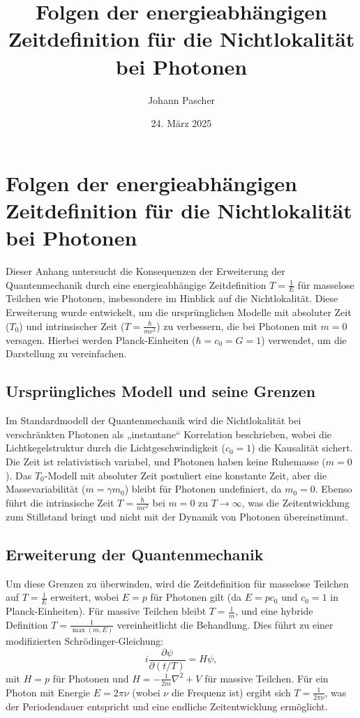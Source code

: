 \documentclass[a4paper,12pt]{article}
\begin{document}
	
	\title{Folgen der energieabhängigen Zeitdefinition für die Nichtlokalität bei Photonen}
	\author{Johann Pascher}
	\date{24. März 2025}
	\maketitle
	
	\tableofcontents %
	\newpage %
	
	\section{Folgen der energieabhängigen Zeitdefinition für die Nichtlokalität bei Photonen}
	Dieser Anhang untersucht die Konsequenzen der Erweiterung der Quantenmechanik durch eine energieabhängige Zeitdefinition \( T = \frac{1}{E} \) für masselose Teilchen wie Photonen, insbesondere im Hinblick auf die Nichtlokalität. Diese Erweiterung wurde entwickelt, um die ursprünglichen Modelle mit absoluter Zeit (\( T_0 \)) und intrinsischer Zeit (\( T = \frac{\hbar}{m c^2} \)) zu verbessern, die bei Photonen mit \( m = 0 \) versagen. Hierbei werden Planck-Einheiten (\( \hbar = c_0 = G = 1 \)) verwendet, um die Darstellung zu vereinfachen.
	
	\subsection{Ursprüngliches Modell und seine Grenzen}
	Im Standardmodell der Quantenmechanik wird die Nichtlokalität bei verschränkten Photonen als „instantane“ Korrelation beschrieben, wobei die Lichtkegelstruktur durch die Lichtgeschwindigkeit (\( c_0 = 1 \)) die Kausalität sichert. Die Zeit ist relativistisch variabel, und Photonen haben keine Ruhemasse (\( m = 0 \)). Das \( T_0 \)-Modell mit absoluter Zeit postuliert eine konstante Zeit, aber die Massevariabilität (\( m = \gamma m_0 \)) bleibt für Photonen undefiniert, da \( m_0 = 0 \). Ebenso führt die intrinsische Zeit \( T = \frac{\hbar}{m c^2} \) bei \( m = 0 \) zu \( T \to \infty \), was die Zeitentwicklung zum Stillstand bringt und nicht mit der Dynamik von Photonen übereinstimmt.
	
	\subsection{Erweiterung der Quantenmechanik}
	Um diese Grenzen zu überwinden, wird die Zeitdefinition für masselose Teilchen auf \( T = \frac{1}{E} \) erweitert, wobei \( E = p \) für Photonen gilt (da \( E = p c_0 \) und \( c_0 = 1 \) in Planck-Einheiten). Für massive Teilchen bleibt \( T = \frac{1}{m} \), und eine hybride Definition \( T = \frac{1}{\max(m, E)} \) vereinheitlicht die Behandlung. Dies führt zu einer modifizierten Schrödinger-Gleichung:
	\[
	i \frac{\partial \psi}{\partial (t/T)} = H \psi,
	\]
	mit \( H = p \) für Photonen und \( H = -\frac{1}{2m} \nabla^2 + V \) für massive Teilchen. Für ein Photon mit Energie \( E = 2\pi \nu \) (wobei \( \nu \) die Frequenz ist) ergibt sich \( T = \frac{1}{2\pi \nu} \), was der Periodendauer entspricht und eine endliche Zeitentwicklung ermöglicht.
	
\end{document}
